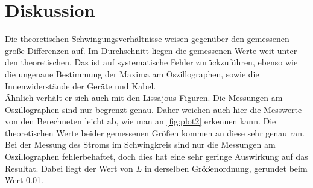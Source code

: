 \section{Diskussion}
\label{sec:Diskussion}



Die theoretischen Schwingungsverhältnisse weisen gegenüber den gemessenen große Differenzen auf.
Im Durchschnitt liegen die gemessenen Werte weit unter den theoretischen.
Das ist auf systematische Fehler zurückzuführen, ebenso wie die ungenaue Bestimmung der Maxima am Oszillographen, sowie die Innenwiderstände der Geräte und Kabel.
\\
Ähnlich verhält er sich auch mit den Lissajous-Figuren. Die Messungen am Oszillographen sind nur begrenzt genau.
Daher weichen auch hier die Messwerte von den Berechneten leicht ab, wie man an \autoref{fig:plot2} erkennen kann.
Die theoretischen Werte beider gemessenen Größen kommen an diese sehr genau ran.
\\
Bei der Messung des Stroms im Schwingkreis sind nur die Messungen am Oszillographen fehlerbehaftet, doch dies hat eine sehr geringe Auswirkung auf das Resultat.
Dabei liegt der Wert von \(L\) in derselben Größenordnung, gerundet beim Wert 0.01.

